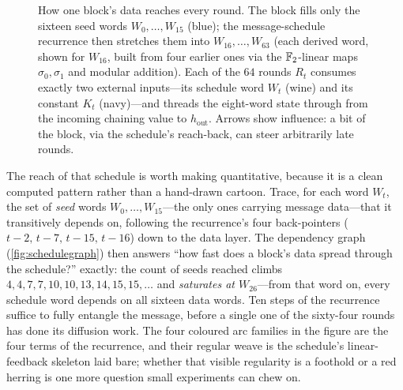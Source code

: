 \begin{figure}[ht]
  \caption{How one block's data reaches every round. The block fills only
  the sixteen seed words $W_0,\dots,W_{15}$ (blue); the message-schedule
  recurrence then stretches them into $W_{16},\dots,W_{63}$ (each derived
  word, shown for $W_{16}$, built from four earlier ones via the
  $\mathbb{F}_2$-linear maps $\sigma_0,\sigma_1$ and modular addition). Each of
  the $64$ rounds $R_t$ consumes exactly two external inputs---its
  schedule word $W_t$ (wine) and its constant $K_t$ (navy)---and threads
  the eight-word state through from the incoming chaining value to
  $h_{\mathrm{out}}$. Arrows show influence: a bit of the block, via the
  schedule's reach-back, can steer arbitrarily late rounds.}
  \label{fig:schedule}
\end{figure}

The reach of that schedule is worth making quantitative, because it is a
clean computed pattern rather than a hand-drawn cartoon. Trace, for each
word $W_t$, the set of \emph{seed} words $W_0,\dots,W_{15}$---the only
ones carrying message data---that it transitively depends on, following
the recurrence's four back-pointers ($t-2,\,t-7,\,t-15,\,t-16$) down to
the data layer. The dependency graph
(\cref{fig:schedulegraph}) then answers ``how fast does a block's data
spread through the schedule?'' exactly: the count of seeds reached climbs
$4,4,7,7,10,10,13,14,15,15,\dots$ and \emph{saturates at $W_{26}$}---from
that word on, every schedule word depends on all sixteen data words. Ten
steps of the recurrence suffice to fully entangle the message, before a
single one of the sixty-four rounds has done its diffusion work. The
four coloured arc families in the figure are the four terms of the
recurrence, and their regular weave is the schedule's linear-feedback
skeleton laid bare; whether that visible regularity is a foothold or a
red herring is one more question small experiments can chew on.

